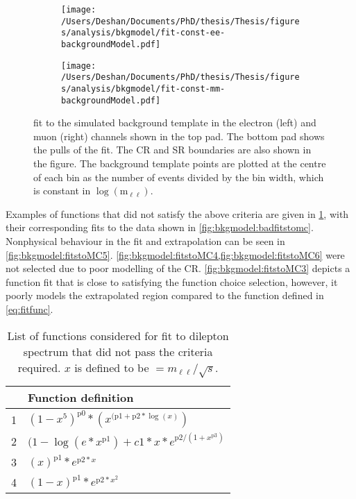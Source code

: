 \begin{figure}[h!]
    \centering
    \begin{subfigure}[b]{0.49\textwidth}
        \centering
        \texttt{[image: /Users/Deshan/Documents/PhD/thesis/Thesis/figures/analysis/bkgmodel/fit-const-ee-backgroundModel.pdf]}
        \label{fig:bkgmodel:fitstoMC1}
    \end{subfigure}
    \begin{subfigure}[b]{0.49\textwidth}
        \centering
        \texttt{[image: /Users/Deshan/Documents/PhD/thesis/Thesis/figures/analysis/bkgmodel/fit-const-mm-backgroundModel.pdf]}
        \label{fig:bkgmodel:fitstoMC2}
    \end{subfigure}
    \caption[Fits to the simulated background template in the electron and muon channels]{fit to the simulated background template in the electron (left) and muon (right) channels shown in the top pad. The bottom pad shows the pulls of the fit. The CR and SR boundaries are also shown in the figure. The background template points are plotted at the centre of each bin as the number of events divided by the bin width, which is constant in $\log{(\text{m}_{\ell\ell})}$.}
    \label{fig:bkgmodel:fitstoMC}
\end{figure}

Examples of functions that did not satisfy the above criteria are given in \cref{tab:bkgmodel:functions}, with their corresponding fits to the data shown in \cref{fig:bkgmodel:badfitstomc}. Nonphysical behaviour in the fit and  extrapolation can be seen in \cref{fig:bkgmodel:fitstoMC5}. \cref{fig:bkgmodel:fitstoMC4,fig:bkgmodel:fitstoMC6} were not selected due to poor modelling of the CR. \cref{fig:bkgmodel:fitstoMC3} depicts a function fit that is close to satisfying the function choice selection, however, it poorly models the extrapolated region compared to the function defined in \cref{eq:fitfunc}.

\begin{table}[h!]
    \centering
    \begin{tabular}{c|l}
         & Function definition \\
        \hline\hline 
        1 & $(1 - x^{5})^{\text{p0}}*(x^{(\text{p1} + \text{p2}*\log(x)})$ \\
        2 & $(1-\log(e*x^{\text{p1}})+c1*x*e^{\text{p2}/(1+x^{\text{p3}})}$ \\
        3 & $(x)^{\text{p1}}*e^{\text{p2}*x}$\\
        4 & $(1-x)^{\text{p1}}*e^{\text{p2}*x^2}$ \\
	\end{tabular}
    \caption[List of functions considered for the background fit]{List of functions considered for fit to dilepton spectrum that did not pass the criteria required. $x$ is defined to be $= m_{\ell\ell}/\sqrt{s}$. }
    \label{tab:bkgmodel:functions}
\end{table}


